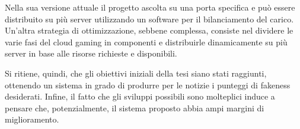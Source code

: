 Nella sua versione attuale il progetto ascolta su una porta specifica e può essere distribuito su più server utilizzando un software per il bilanciamento del carico. Un'altra strategia di ottimizzazione, sebbene complessa, consiste nel dividere le varie fasi del cloud gaming in componenti e distribuirle dinamicamente su più server in base alle risorse richieste e disponibili.

Si ritiene, quindi, che gli obiettivi iniziali della tesi siano stati raggiunti, ottenendo un sistema in grado di produrre per le notizie i punteggi di fakeness desiderati. Infine, il fatto che gli sviluppi possibili sono molteplici induce a pensare che, potenzialmente, il sistema proposto abbia ampi margini di miglioramento.